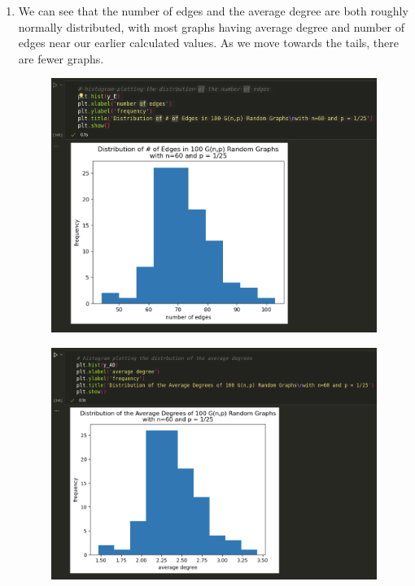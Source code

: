 \documentclass{article}
\begin{document}
\begin{enumerate}[label=(\alph*), left=10pt, itemsep=10pt]
        \item \begin{minipage}[t]{0.9\textwidth}
            We can see that the number of edges and the average degree are both roughly normally distributed, with most
            graphs having average degree and number of edges near our earlier calculated values. As we move towards the tails,
            there are fewer graphs. 
            \begin{figure}[H]
                \centering
                \includegraphics[width=1\textwidth, height=0.4\textheight]{./3bi.png}
            \end{figure}
            \begin{figure}[H]
                \centering
                \includegraphics[width=1\textwidth, height=0.4\textheight]{./3bii.png}

\end{figure}
\end{minipage}
\end{enumerate}
\end{document}
